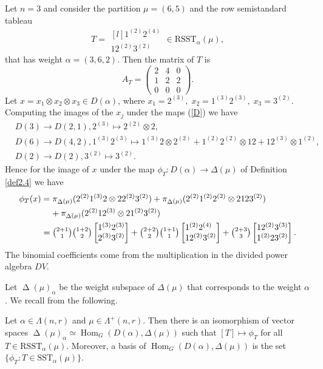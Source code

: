 \documentclass[ALCO,Unicode]{cedram}
\newcommand{\al}{\alpha}
\DeclareMathOperator{\Hom}{Hom}
\DeclareMathOperator{\D}{\mathrm{\Delta}}
\numberwithin{equation}{section}
\begin{document}
\begin{exam*}
	Let $n=3$ and consider the partition $\mu=(6,5)$ and the row semistandard tableau \[ T=\begin{matrix*}[l]
		1^{(2)} 2^{(4)} \\
		12^{(2)}3^{(2)}  \end{matrix*} \in \mathrm{RSST}_{\al}(\mu), \] 
that has weight $\alpha=(3,6,2)$. Then the matrix of $T$ is \[A_T=\begin{pmatrix*}
	2& 4& 0 \\ 1& 2& 2 \\ 0& 0& 0
 \end{pmatrix*}.\]Let $x=x_1 \otimes x_2 \otimes x_3 \in D(\alpha)$, where $x_1=2^{(3)}, \; x_2= 1^{(3)}2^{(3)}, \;  x_3=3^{(2)}.$
Computing the images of the $x_j$ under the maps (\ref{D}) we have \begin{align*}
	&D(3) \to D(2,1), 2^{(3)} \mapsto 2^{(2)} \otimes 2,\\&
	D(6) \to D(4,2), 1^{(3)}2^{(3)} \mapsto 1^{(3)}2 \otimes 2^{(2)} +1^{(2)}2^{(2)} \otimes 12 + 12^{(3)} \otimes 1^{(2)},\\&
	D(2) \to D(2), 3^{(2)} \mapsto 3^{(2)}.
\end{align*} Hence for the image of $x$ under the map $\phi_T: D(\alpha) \to \Delta(\mu)$ of Definition \ref{def2.4} we have \begin{align*}
\phi_T(x)&={\pi}_{\D(\mu)}(2^{(2)}1^{(3)}2 \otimes 2 2^{(2)}  3^{(2)}) + {\pi}_{\D(\mu)}(2^{(2)} 1^{(2)}2^{(2)}\otimes 2 12 3^{(2)}) \\& \; \; \;  \; +{\pi}_{\D(\mu)}(2^{(2)} 12^{(3)}\otimes 2 1^{(2)} 3^{(2)}) \\&= \tbinom{2+1}{1} \tbinom{1+2}{2}	\begin{bmatrix*}[l]
	1^{(3)}2^{(3)}  \\
	2^{(3)} 3^{(2)}
\end{bmatrix*} +\tbinom{2+2}{2} \tbinom{1+1}{1}	\begin{bmatrix*}[l]
1^{(2)}2^{(4)}  \\
12^{(2)} 3^{(2)}
\end{bmatrix*} + \tbinom{2+3}{3}	\begin{bmatrix*}[l]
12^{(2)}3^{(3)}  \\
1^{(2)}2 3^{(2)}
\end{bmatrix*}.
\end{align*}
The binomial coefficients come from the multiplication in the divided power algebra $DV$.	
\end{exam*}
Let $\D(\mu)_{\al}$ be the weight subspace of $\Delta(\mu)$ that corresponds to the weight $\al$. We recall from \cite[Section 2]{AB} the following.
\begin{prop}[\cite{AB}] Let $\al \in \Lambda(n,r)$ and $\mu \in \Lambda^+(n,r)$. Then there is an isomorphism of vector spaces $\D(\mu)_{\al} \simeq \Hom_G(D(\al), \Delta(\mu))$ such that $[T] \mapsto \phi_T$ for all $T \in \mathrm{RSST}_{\al}(\mu)$. Moreover, a basis of $\Hom_G(D(\al), \Delta(\mu))$ is the set $\{\phi_T: T \in \mathrm{SST}_{\al}(\mu)\}.$
\end{prop}
\end{document}
